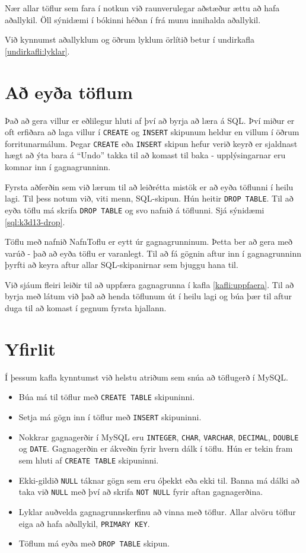 Nær allar töflur sem fara í notkun við raunverulegar aðstæður ættu að hafa aðallykil. Öll sýnidæmi í bókinni héðan í frá munu innihalda aðallykil.

Við kynnumst aðallyklum og öðrum lyklum örlítið betur í undirkafla \ref{undirkafli:lyklar}.
\section{Að eyða töflum} %
\label{undirkafli:drop}
Það að gera villur er eðlilegur hluti af því að byrja að læra á SQL. Því miður er oft erfiðara að laga villur í \verb|CREATE| og \verb|INSERT| skipunum heldur en villum í öðrum forritunarmálum. Þegar \verb|CREATE| eða \verb|INSERT| skipun hefur verið keyrð er sjaldnast hægt að ýta bara á ``Undo'' takka til að komast til baka - upplýsingarnar eru komnar inn í gagnagrunninn.

Fyrsta aðferðin sem við lærum til að leiðrétta mistök er að eyða töflunni í heilu lagi. Til þess notum við, viti menn, SQL-skipun. Hún heitir \verb|DROP TABLE|. Til að eyða töflu má skrifa \verb|DROP TABLE| og svo nafnið á töflunni. Sjá sýnidæmi \ref{sql:k3d13-drop}.

\begin{example}
\caption[DROP TABLE]{Töflu með nafnið NafnToflu er eytt úr gagnagrunninum. Þetta ber að gera með varúð - það að eyða töflu er varanlegt. Til að fá gögnin aftur inn í gagnagrunninn þyrfti að keyra aftur allar SQL-skipanirnar sem bjuggu hana til.}
\label{sql:k3d13-drop}
\centering
{}
\end{example}

Við sjáum fleiri leiðir til að uppfæra gagnagrunna í kafla \ref{kafli:uppfaera}. Til að byrja með látum við það að henda töflunum út í heilu lagi og búa þær til aftur duga til að komast í gegnum fyrsta hjallann.

\section{Yfirlit}
Í þessum kafla kynntumst við helstu atriðum sem snúa að töflugerð í MySQL.

\begin{itemize}
 \item Búa má til töflur með \verb|CREATE TABLE| skipuninni.
 \item Setja má gögn inn í töflur með \verb|INSERT| skipuninni.
 \item Nokkrar gagnagerðir í MySQL eru \verb|INTEGER|, \verb|CHAR|, \verb|VARCHAR|, \verb|DECIMAL|, \verb|DOUBLE| og \verb|DATE|. Gagnagerðin er ákveðin fyrir hvern dálk í töflu. Hún er tekin fram sem hluti af \verb|CREATE TABLE| skipuninni.
 \item Ekki-gildið \verb|NULL| táknar gögn sem eru óþekkt eða ekki til. Banna má dálki að taka við \verb|NULL| með því að skrifa \verb|NOT NULL| fyrir aftan gagnagerðina.
 \item Lyklar auðvelda gagnagrunnskerfinu að vinna með töflur. Allar alvöru töflur eiga að hafa aðallykil, \verb|PRIMARY KEY|.
 \item Töflum má eyða með \verb|DROP TABLE| skipun.
\end{itemize}
